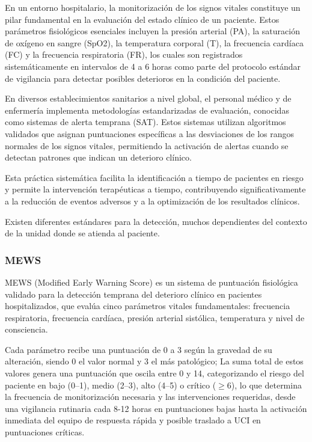 En un entorno hospitalario, la monitorización de los signos vitales constituye un pilar fundamental en la evaluación del estado clínico de un paciente. 
Estos parámetros fisiológicos esenciales incluyen la presión arterial (PA), la saturación de oxígeno en sangre (SpO2), la temperatura corporal (T), 
la frecuencia cardíaca (FC) y la frecuencia respiratoria (FR), los cuales son registrados sistemáticamente en intervalos de 4 a 6 horas 
como parte del protocolo estándar de vigilancia para detectar posibles deterioros en la condición del paciente.

En diversos establecimientos sanitarios a nivel global, el personal médico y de enfermería implementa metodologías estandarizadas de evaluación, 
conocidas como sistemas de alerta temprana (SAT). 
Estos sistemas utilizan algoritmos validados que asignan puntuaciones específicas a las desviaciones de los rangos normales de los signos vitales, 
permitiendo la activación de alertas cuando se detectan patrones que indican un deterioro clínico. 

Esta práctica sistemática facilita la identificación a tiempo de pacientes en riesgo y permite la intervención terapéuticas a tiempo, 
contribuyendo significativamente a la reducción de eventos adversos y a la optimización de los resultados clínicos.

Existen diferentes estándares para la detección, muchos dependientes del contexto de la unidad donde se atienda al paciente. \parencite{rpm_pm}

\subsubsection{MEWS}
MEWS (Modified Early Warning Score) es un sistema de puntuación fisiológica validado para la detección temprana del deterioro clínico en pacientes hospitalizados, 
que evalúa cinco parámetros vitales fundamentales: frecuencia respiratoria, frecuencia cardíaca, presión arterial sistólica, temperatura 
y nivel de consciencia. 

Cada parámetro recibe una puntuación de 0 a 3 según la gravedad de su alteración, siendo 0 el valor normal y 3 el más patológico; 
La suma total de estos valores genera una puntuación que oscila entre 0 y 14, categorizando el riesgo del paciente en bajo (0--1), medio (2--3), alto (4--5) o crítico ($\geq$6), 
lo que determina la frecuencia de monitorización necesaria y las intervenciones requeridas, 
desde una vigilancia rutinaria cada 8-12 horas en puntuaciones bajas hasta la activación inmediata del equipo de respuesta rápida y posible traslado a UCI en puntuaciones críticas.

